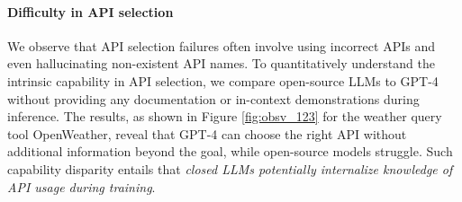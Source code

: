 
\paragraph{Difficulty in API selection}
% 
We observe that API selection failures often involve using incorrect APIs and even hallucinating non-existent API names.
To quantitatively understand the intrinsic capability in API selection, we compare open-source LLMs to GPT-4 without providing any documentation or in-context demonstrations during inference. The results, as shown in Figure \ref{fig:obsv_123} for the weather query tool OpenWeather, reveal that GPT-4 can choose the right API without additional information beyond the goal, while open-source models struggle. Such capability disparity entails that \emph{closed LLMs potentially internalize knowledge of API usage during training}.

